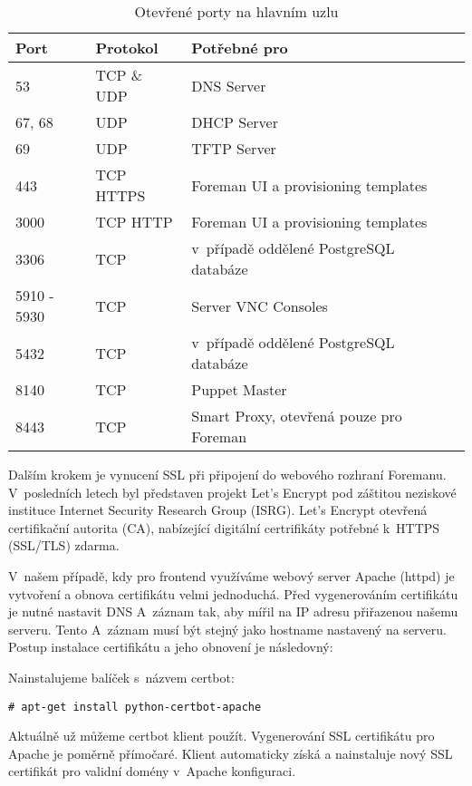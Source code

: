 \begin{table}[h]
\centering
\caption{Otevřené porty na hlavním uzlu}
\label{my-label}
\begin{tabular}{@{}lllll@{}}
\toprule

Port &	Protokol &	Potřebné pro  \\ \midrule
53 &	TCP \& UDP &	DNS Server \\
67, 68 &	UDP &	DHCP  Server \\
69 &	UDP	&  TFTP Server \\
 443 &	TCP HTTP\/S &  Foreman UI a provisioning templates \\
3000 &	TCP	HTTP &  Foreman UI a provisioning templates \\
3306 &	TCP &	v~případě oddělené PostgreSQL databáze \\
5910 - 5930 &	TCP &	Server VNC Consoles \\
5432 &	TCP &	v~případě oddělené PostgreSQL databáze \\
8140 &	TCP &	Puppet Master \\
8443 &	TCP &	Smart Proxy, otevřená pouze pro Foreman \\ \bottomrule
\end{tabular}
\end{table}

\label{lets-encrypt}
Dalším krokem je vynucení SSL při připojení do webového rozhraní Foremanu. V~posledních letech byl představen projekt Let's Encrypt pod záštitou neziskové instituce Internet Security Research Group (ISRG). Let's Encrypt otevřená certifikační autorita (CA), nabízející digitální certrifikáty potřebné k~HTTPS (SSL/TLS) zdarma.

V~našem případě, kdy pro frontend využíváme webový server Apache (httpd) je vytvoření a obnova certifikátu velmi jednoduchá. Před vygenerováním certifikátu je nutné nastavit DNS A~záznam tak, aby mířil na IP adresu přiřazenou našemu serveru. Tento A~záznam musí být stejný jako hostname nastavený na serveru.  Postup instalace certifikátu a jeho obnovení je následovný:

Nainstalujeme balíček s~názvem certbot:

\begin{verbatim}
# apt-get install python-certbot-apache
\end{verbatim}

Aktuálně už můžeme certbot klient použít. Vygenerování SSL certifikátu pro Apache je poměrně přímočaré. Klient automaticky získá a nainstaluje nový SSL certifikát pro validní domény v~Apache konfiguraci.

